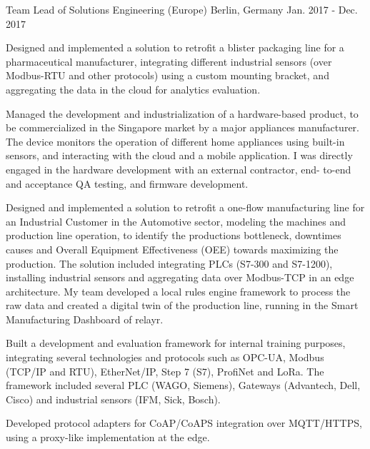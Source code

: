 \begin{cventries}
  \cventry
    {Team Lead of Solutions Engineering (Europe)} %
    {} %
    {Berlin, Germany} %
    {Jan. 2017 - Dec. 2017} %
    {
      \begin{cvitems} %
        \item {Designed and implemented a solution to retrofit a blister packaging line for a pharmaceutical manufacturer, integrating different industrial sensors (over Modbus-RTU and other protocols) using a custom mounting bracket, and aggregating the data in the cloud for analytics evaluation.}
        \item {Managed the development and industrialization of a hardware-based product, to be commercialized in the Singapore market by a major appliances manufacturer. The device monitors the operation of different home appliances using built-in sensors, and interacting with the cloud and a mobile application. I was directly engaged in the hardware development with an external contractor, end- to-end and acceptance QA testing, and firmware development.}
        \item {Designed and implemented a solution to retrofit a one-flow manufacturing line for an Industrial Customer in the Automotive sector, modeling the machines and production line operation, to identify the productions bottleneck, downtimes causes and Overall Equipment Effectiveness (OEE) towards maximizing the production. The solution included integrating  PLCs (S7-300 and S7-1200), installing industrial sensors and aggregating data over Modbus-TCP in an edge architecture.  My team developed a local rules engine framework to process the raw data and created a digital twin of the production line, running in the Smart Manufacturing Dashboard of relayr.}
        \item {Built a development and evaluation framework for internal training purposes, integrating several technologies and protocols such as OPC-UA, Modbus (TCP/IP and RTU), EtherNet/IP, Step 7 (S7), ProfiNet and LoRa. The framework included several PLC (WAGO, Siemens), Gateways (Advantech, Dell, Cisco) and industrial sensors (IFM, Sick, Bosch).}
        \item {Developed protocol adapters for CoAP/CoAPS integration over MQTT/HTTPS, using a proxy-like implementation at the edge.}
      \end{cvitems}
    }


  \cventry %
    {}
    {}
    {}
    {}
    {}

\end{cventries}

